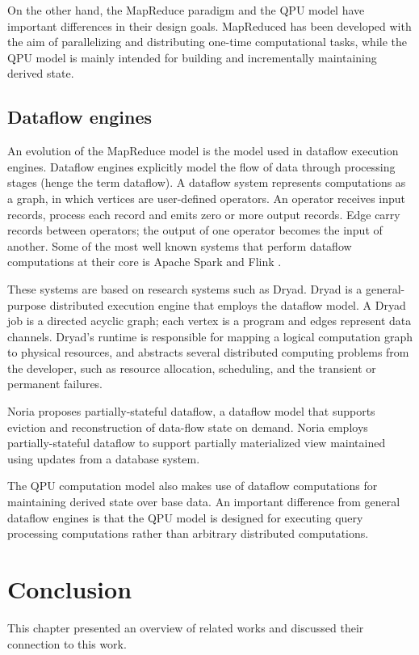 On the other hand, the MapReduce paradigm and the QPU model have important differences in their design goals.
MapReduced has been developed with the aim of parallelizing and distributing one-time computational tasks,
while the QPU model is mainly intended for building and incrementally maintaining derived state.

\subsection{Dataflow engines}
An evolution of the MapReduce model is the model used in dataflow execution engines.
Dataflow engines explicitly model the flow of data through processing stages (henge the term dataflow).
A dataflow system represents computations as a graph, in which vertices are user-defined operators.
An operator receives input records, process each record and emits zero or more output records.
Edge carry records between operators; the output of one operator becomes the input of another.
Some of the most well known systems that perform dataflow computations at their core is
Apache Spark \cite{zaharia:spark} and Flink \cite{carbone:flink}.

These systems are based on research systems such as Dryad.
Dryad \cite{isard:dryad} is a general-purpose distributed execution engine that employs the dataflow model.
A Dryad job is a directed acyclic graph; each vertex is a program and edges represent data channels.
Dryad's runtime is responsible for mapping a logical computation graph to physical resources,
and abstracts several distributed computing problems from the developer,
such as resource allocation, scheduling, and the transient or permanent failures.

Noria \cite{gjengset:noria} proposes partially-stateful dataflow,
a dataflow model that supports eviction and reconstruction of data-flow state on demand.
Noria employs partially-stateful dataflow to support partially materialized view maintained
using updates from a database system.

The QPU computation model also makes use of dataflow computations for maintaining derived state
over base data.
An important difference from general dataflow engines is that the QPU model is designed for executing
query processing computations rather than arbitrary distributed computations.

\section{Conclusion}
This chapter presented an overview of related works and discussed their connection to this work.